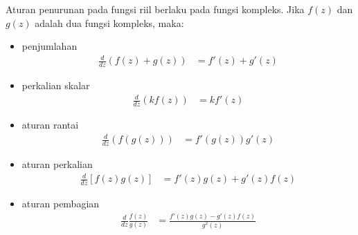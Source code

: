 \documentclass{article}
\begin{document}
    Aturan penurunan pada fungsi riil berlaku pada fungsi kompleks. Jika $f(z)$ dan $g(z)$ adalah dua fungsi kompleks, maka:
    \begin{itemize}
        \item penjumlahan
        \begin{align}
            \frac{d}{dz}(f(z)+g(z)) &= f'(z) + g'(z)
        \end{align}
        \item perkalian skalar
        \begin{align}
            \frac{d}{dz}(kf(z)) &= kf'(z)
        \end{align}
        \item aturan rantai
        \begin{align}
            \frac{d}{dz}(f(g(z))) &= f'(g(z)) g'(z)
        \end{align}
        \item aturan perkalian
        \begin{align}
            \frac{d}{dz}[f(z)g(z)] &= f'(z)g(z) + g'(z)f(z)
        \end{align}
        \item aturan pembagian
        \begin{align}
            \frac{d}{dz}\frac{f(z)}{g(z)} &= \frac{f'(z)g(z) - g'(z)f(z)}{g^2(z)}
        \end{align}
    \end{itemize}
\end{document}
